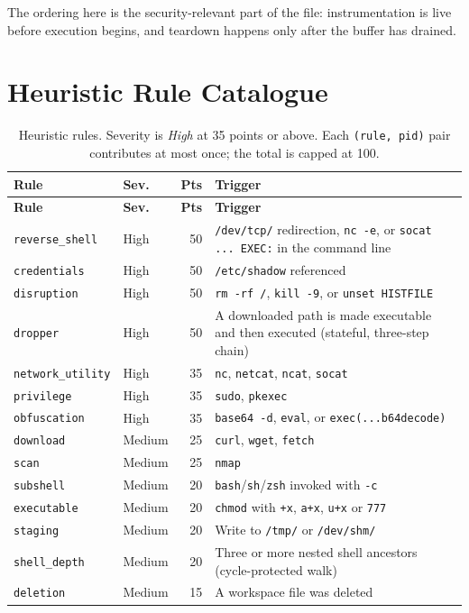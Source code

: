 \documentclass[11pt,a4paper]{article}
\newcommand{\code}[1]{\texttt{\small #1}}
\newcommand{\file}[1]{\texttt{\small #1}}
\begin{document}
The ordering here is the security-relevant part of the file: instrumentation is live
before execution begins, and teardown happens only after the buffer has drained.

\section{Heuristic Rule Catalogue}
\label{sec:rules}

\begin{longtable}{@{}llrp{62mm}@{}}
\caption{Heuristic rules. Severity is \emph{High} at 35 points or above. Each
\code{(rule, pid)} pair contributes at most once; the total is capped at 100.}
\label{tab:rules}\\
\toprule
\textbf{Rule} & \textbf{Sev.} & \textbf{Pts} & \textbf{Trigger} \\
\midrule
\endfirsthead
\toprule
\textbf{Rule} & \textbf{Sev.} & \textbf{Pts} & \textbf{Trigger} \\
\midrule
\endhead
\code{reverse\_shell} & High & 50 & \code{/dev/tcp/} redirection, \code{nc -e},
  or \code{socat ... EXEC:} in the command line \\
\code{credentials}    & High & 50 & \file{/etc/shadow} referenced \\
\code{disruption}     & High & 50 & \code{rm -rf /}, \code{kill -9},
  or \code{unset HISTFILE} \\
\code{dropper}        & High & 50 & A downloaded path is made executable and then
  executed (stateful, three-step chain) \\
\code{network\_utility}& High & 35 & \code{nc}, \code{netcat}, \code{ncat},
  \code{socat} \\
\code{privilege}      & High & 35 & \code{sudo}, \code{pkexec} \\
\code{obfuscation}    & High & 35 & \code{base64 -d}, \code{eval}, or
  \code{exec(...b64decode)} \\
\code{download}       & Medium & 25 & \code{curl}, \code{wget}, \code{fetch} \\
\code{scan}           & Medium & 25 & \code{nmap} \\
\code{subshell}       & Medium & 20 & \code{bash}/\code{sh}/\code{zsh} invoked with
  \code{-c} \\
\code{executable}     & Medium & 20 & \code{chmod} with \code{+x}, \code{a+x},
  \code{u+x} or \code{777} \\
\code{staging}        & Medium & 20 & Write to \file{/tmp/} or \file{/dev/shm/} \\
\code{shell\_depth}   & Medium & 20 & Three or more nested shell ancestors
  (cycle-protected walk) \\
\code{deletion}       & Medium & 15 & A workspace file was deleted \\
\bottomrule
\end{longtable}
\end{document}
